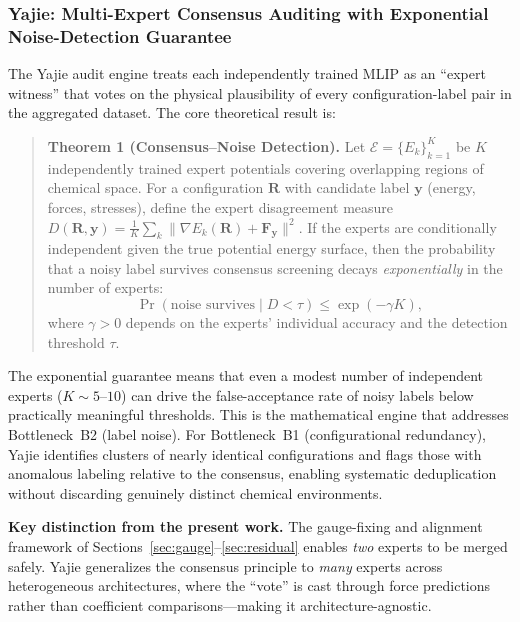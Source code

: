 \documentclass[twoside,prb,aps,floatfix,superscriptaddress,longbibliography]{revtex4-2}
\begin{document}
\subsubsection{Yajie: Multi-Expert Consensus Auditing with Exponential Noise-Detection Guarantee}

The Yajie audit engine treats each independently trained MLIP as an ``expert witness'' that votes on the physical plausibility of every configuration-label pair in the aggregated dataset. The core theoretical result is:

\begin{quote}
\textbf{Theorem 1 (Consensus–Noise Detection).} Let $\mathcal{E} = \{E_k\}_{k=1}^K$ be $K$ independently trained expert potentials covering overlapping regions of chemical space. For a configuration $\mathbf{R}$ with candidate label $\mathbf{y}$ (energy, forces, stresses), define the expert disagreement measure $D(\mathbf{R}, \mathbf{y}) = \frac{1}{K}\sum_k \| \nabla E_k(\mathbf{R}) + \mathbf{F}_{\mathbf{y}} \|^2$. If the experts are conditionally independent given the true potential energy surface, then the probability that a noisy label survives consensus screening decays \emph{exponentially} in the number of experts:
\begin{equation}
\Pr(\text{noise survives} \mid D < \tau) \le \exp(-\gamma K),
\label{eq:yajie_exp_guarantee}
\end{equation}
where $\gamma > 0$ depends on the experts' individual accuracy and the detection threshold $\tau$.
\end{quote}

The exponential guarantee means that even a modest number of independent experts ($K \sim 5$--$10$) can drive the false-acceptance rate of noisy labels below practically meaningful thresholds. This is the mathematical engine that addresses Bottleneck~B2 (label noise). For Bottleneck~B1 (configurational redundancy), Yajie identifies clusters of nearly identical configurations and flags those with anomalous labeling relative to the consensus, enabling systematic deduplication without discarding genuinely distinct chemical environments.

\textbf{Key distinction from the present work.} The gauge-fixing and alignment framework of Sections~\ref{sec:gauge}--\ref{sec:residual} enables \emph{two} experts to be merged safely. Yajie generalizes the consensus principle to \emph{many} experts across heterogeneous architectures, where the ``vote'' is cast through force predictions rather than coefficient comparisons---making it architecture-agnostic.
\end{document}

